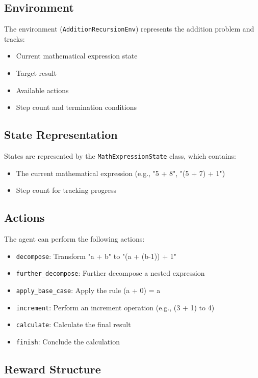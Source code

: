 \documentclass{article}
\begin{document}
\subsection{Environment}

The environment (\texttt{AdditionRecursionEnv}) represents the addition problem and tracks:
\begin{itemize}
    \item Current mathematical expression state
    \item Target result
    \item Available actions
    \item Step count and termination conditions
\end{itemize}

\subsection{State Representation}

States are represented by the \texttt{MathExpressionState} class, which contains:
\begin{itemize}
    \item The current mathematical expression (e.g., "5 + 8", "(5 + 7) + 1")
    \item Step count for tracking progress
\end{itemize}

\subsection{Actions}

The agent can perform the following actions:
\begin{itemize}
    \item \texttt{decompose}: Transform "a + b" to "(a + (b-1)) + 1"
    \item \texttt{further\_decompose}: Further decompose a nested expression
    \item \texttt{apply\_base\_case}: Apply the rule (a + 0) = a
    \item \texttt{increment}: Perform an increment operation (e.g., (3 + 1) to 4)
    \item \texttt{calculate}: Calculate the final result
    \item \texttt{finish}: Conclude the calculation
\end{itemize}

\subsection{Reward Structure}
\end{document}
